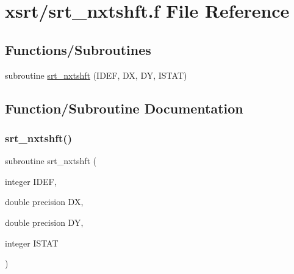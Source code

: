 \hypertarget{srt__nxtshft_8f}{}\section{xsrt/srt\+\_\+nxtshft.f File Reference}
\label{srt__nxtshft_8f}
\subsection*{Functions/\+Subroutines}
\begin{DoxyCompactItemize}
\item 
subroutine \hyperlink{srt__nxtshft_8f_abb39eae549209e01dd35115ca0fbfe59}{srt\+\_\+nxtshft} (I\+D\+EF, DX, DY, I\+S\+T\+AT)
\end{DoxyCompactItemize}


\subsection{Function/\+Subroutine Documentation}
\mbox{\label{srt__nxtshft_8f_abb39eae549209e01dd35115ca0fbfe59}} 
\subsubsection{\texorpdfstring{srt\+\_\+nxtshft()}{srt\_nxtshft()}}
{\footnotesize\ttfamily subroutine srt\+\_\+nxtshft (\begin{DoxyParamCaption}\item[{integer}]{I\+D\+EF,  }\item[{double precision}]{DX,  }\item[{double precision}]{DY,  }\item[{integer}]{I\+S\+T\+AT }\end{DoxyParamCaption})}

